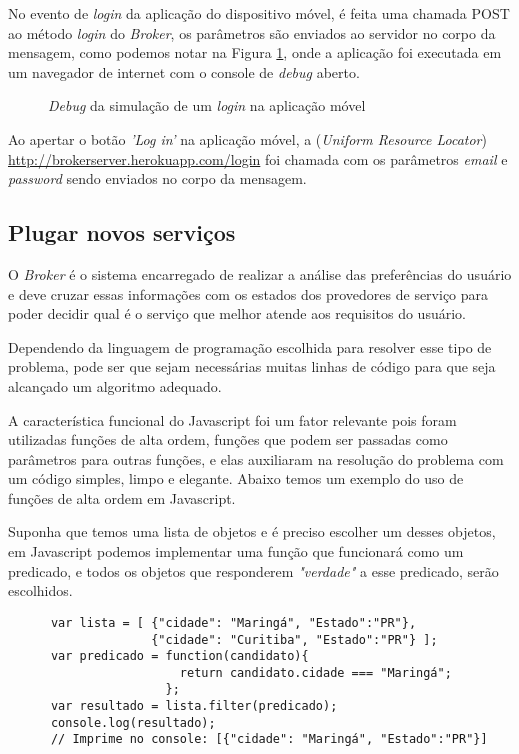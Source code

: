 No evento de \textit{login} da aplicação do dispositivo móvel, é feita uma chamada POST ao método \textit{login} do \textit{Broker}, os parâmetros são enviados ao servidor no corpo da mensagem, como podemos notar na Figura \ref{fig:logindebug}, onde a aplicação foi executada em um navegador de internet com o console de \textit{debug} aberto.

\begin{figure}[h]
  \center
  \qquad
  \caption[\textit{Debug} da simulação de um \textit{login} na aplicação móvel]{\textit{Debug} da simulação de um \textit{login} na aplicação móvel}
  \label{fig:logindebug}
\end{figure}

Ao apertar o botão \textit{'Log in'} na aplicação móvel, a  (\textit{Uniform Resource Locator}) \url{
http://brokerserver.herokuapp.com/login} foi chamada com os parâmetros \textit{email} e \textit{password} sendo enviados no corpo da mensagem.

\subsection{Plugar novos serviços}
O \textit{Broker} é o sistema encarregado de realizar a análise das preferências do usuário e deve cruzar essas informações com os estados dos provedores de serviço para poder decidir qual é o serviço que melhor atende aos requisitos do usuário.

Dependendo da linguagem de programação escolhida para resolver esse tipo de problema, pode ser que sejam necessárias muitas linhas de código para que seja alcançado um algoritmo adequado.

A característica funcional do Javascript foi um fator relevante pois foram utilizadas funções de alta ordem, funções que podem ser passadas como parâmetros para outras funções, e elas auxiliaram na resolução do problema com um código simples, limpo e elegante. Abaixo temos um exemplo do uso de funções de alta ordem em Javascript.

Suponha que temos uma lista de objetos e é preciso escolher um desses objetos, em Javascript podemos implementar uma função que funcionará como um predicado, e todos os objetos que responderem \textit{"verdade"} a esse predicado, serão escolhidos.

\begin{footnotesize}
  \begin{verbatim}
      var lista = [ {"cidade": "Maringá", "Estado":"PR"},
                    {"cidade": "Curitiba", "Estado":"PR"} ];
      var predicado = function(candidato){
                        return candidato.cidade === "Maringá";
                      };
      var resultado = lista.filter(predicado);
      console.log(resultado);
      // Imprime no console: [{"cidade": "Maringá", "Estado":"PR"}]
  \end{verbatim}
\end{footnotesize}

